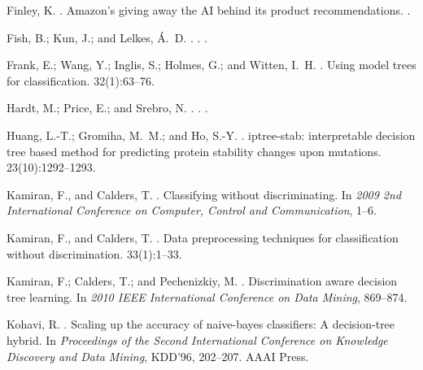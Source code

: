 \documentclass[letterpaper]{article} %
\theoremstyle{definition}
\newcommand{\1}{\ensuremath{{\rm e}}} %
\begin{document}
\begin{thebibliography}{}
	Finley, K.
	.
	\newblock Amazon's giving away the {AI} behind its product recommendations.
	.
	
	{Fish}, B.; {Kun}, J.; and {Lelkes}, {\'A}.~D.
	.
	.
	.
	
	Frank, E.; Wang, Y.; Inglis, S.; Holmes, G.; and Witten, I.~H.
	.
	\newblock Using model trees for classification.
	 32(1):63--76.
	
	{Hardt}, M.; {Price}, E.; and {Srebro}, N.
	.
	.
	.
	
	Huang, L.-T.; Gromiha, M.~M.; and Ho, S.-Y.
	.
	\newblock iptree-stab: interpretable decision tree based method for predicting
	protein stability changes upon mutations.
	 23(10):1292--1293.
	
	Kamiran, F., and Calders, T.
	.
	\newblock Classifying without discriminating.
	\newblock In {\em 2009 2nd International Conference on Computer, Control and
		Communication},  1--6.
	
	Kamiran, F., and Calders, T.
	.
	\newblock Data preprocessing techniques for classification without
	discrimination.
	 33(1):1--33.
	
	Kamiran, F.; Calders, T.; and Pechenizkiy, M.
	.
	\newblock Discrimination aware decision tree learning.
	\newblock In {\em 2010 IEEE International Conference on Data Mining},
	869--874.
	
	Kohavi, R.
	.
	\newblock Scaling up the accuracy of naive-bayes classifiers: A decision-tree
	hybrid.
	\newblock In {\em Proceedings of the Second International Conference on
		Knowledge Discovery and Data Mining}, KDD'96,  202--207.
	\newblock AAAI Press.
	

\end{thebibliography}
\end{document}
